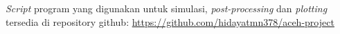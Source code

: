 \vspace{0.5pc}
\noindent \textit{Script} program yang digunakan untuk simulasi, \textit{post-processing} dan \textit{plotting} tersedia di repository github: \href{https://github.com/hidayatmn378/aceh-project}{https://github.com/hidayatmn378/aceh-project}